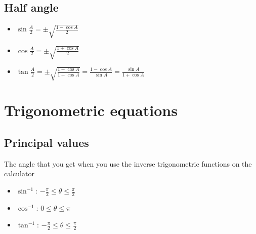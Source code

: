 \subsection{Half angle}
\begin{itemize}
    \item $\sin \frac{A}{2} = \pm \sqrt{\frac{1-\cos A}{2}}$
    \item $\cos \frac{A}{2} = \pm \sqrt{\frac{1+\cos A}{2}}$
    \item $\tan \frac{A}{2} = \pm \sqrt{\frac{1-\cos A}{1+\cos A}} = \frac{1-\cos A}{\sin A} = \frac{\sin A}{1+\cos A}$
\end{itemize}

\section{Trigonometric equations}
\subsection{Principal values}
The angle that you get when you use the inverse trigonometric functions on the calculator
\begin{itemize}
    \item $\sin^{-1}$: $-\frac{\pi}{2}\leq\theta\leq\frac{\pi}{2}$
    \item $\cos^{-1}$: $0\leq\theta\leq\pi$
    \item $\tan^{-1}$: $-\frac{\pi}{2}\leq\theta\leq\frac{\pi}{2}$
\end{itemize}